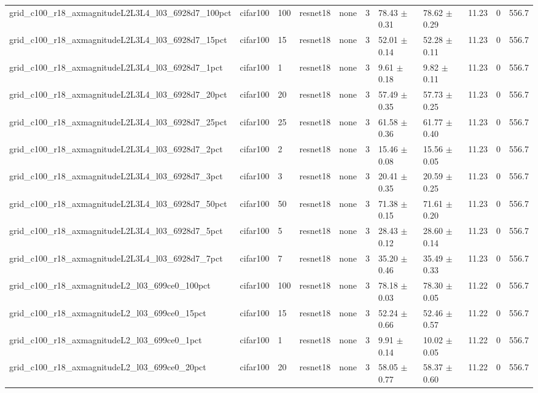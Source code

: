 \begin{tabular}{lllllllllll}
grid_c100_r18_axmagnitudeL2L3L4_l03_6928d7_100pct & cifar100 & 100 & resnet18 & none & 3 & 78.43 $\pm$ 0.31 & 78.62 $\pm$ 0.29 & 11.23 & 0 & 556.7 \\
grid_c100_r18_axmagnitudeL2L3L4_l03_6928d7_15pct & cifar100 & 15 & resnet18 & none & 3 & 52.01 $\pm$ 0.14 & 52.28 $\pm$ 0.11 & 11.23 & 0 & 556.7 \\
grid_c100_r18_axmagnitudeL2L3L4_l03_6928d7_1pct & cifar100 & 1 & resnet18 & none & 3 & 9.61 $\pm$ 0.18 & 9.82 $\pm$ 0.11 & 11.23 & 0 & 556.7 \\
grid_c100_r18_axmagnitudeL2L3L4_l03_6928d7_20pct & cifar100 & 20 & resnet18 & none & 3 & 57.49 $\pm$ 0.35 & 57.73 $\pm$ 0.25 & 11.23 & 0 & 556.7 \\
grid_c100_r18_axmagnitudeL2L3L4_l03_6928d7_25pct & cifar100 & 25 & resnet18 & none & 3 & 61.58 $\pm$ 0.36 & 61.77 $\pm$ 0.40 & 11.23 & 0 & 556.7 \\
grid_c100_r18_axmagnitudeL2L3L4_l03_6928d7_2pct & cifar100 & 2 & resnet18 & none & 3 & 15.46 $\pm$ 0.08 & 15.56 $\pm$ 0.05 & 11.23 & 0 & 556.7 \\
grid_c100_r18_axmagnitudeL2L3L4_l03_6928d7_3pct & cifar100 & 3 & resnet18 & none & 3 & 20.41 $\pm$ 0.35 & 20.59 $\pm$ 0.25 & 11.23 & 0 & 556.7 \\
grid_c100_r18_axmagnitudeL2L3L4_l03_6928d7_50pct & cifar100 & 50 & resnet18 & none & 3 & 71.38 $\pm$ 0.15 & 71.61 $\pm$ 0.20 & 11.23 & 0 & 556.7 \\
grid_c100_r18_axmagnitudeL2L3L4_l03_6928d7_5pct & cifar100 & 5 & resnet18 & none & 3 & 28.43 $\pm$ 0.12 & 28.60 $\pm$ 0.14 & 11.23 & 0 & 556.7 \\
grid_c100_r18_axmagnitudeL2L3L4_l03_6928d7_7pct & cifar100 & 7 & resnet18 & none & 3 & 35.20 $\pm$ 0.46 & 35.49 $\pm$ 0.33 & 11.23 & 0 & 556.7 \\
grid_c100_r18_axmagnitudeL2_l03_699ce0_100pct & cifar100 & 100 & resnet18 & none & 3 & 78.18 $\pm$ 0.03 & 78.30 $\pm$ 0.05 & 11.22 & 0 & 556.7 \\
grid_c100_r18_axmagnitudeL2_l03_699ce0_15pct & cifar100 & 15 & resnet18 & none & 3 & 52.24 $\pm$ 0.66 & 52.46 $\pm$ 0.57 & 11.22 & 0 & 556.7 \\
grid_c100_r18_axmagnitudeL2_l03_699ce0_1pct & cifar100 & 1 & resnet18 & none & 3 & 9.91 $\pm$ 0.14 & 10.02 $\pm$ 0.05 & 11.22 & 0 & 556.7 \\
grid_c100_r18_axmagnitudeL2_l03_699ce0_20pct & cifar100 & 20 & resnet18 & none & 3 & 58.05 $\pm$ 0.77 & 58.37 $\pm$ 0.60 & 11.22 & 0 & 556.7 \\

\end{tabular}
